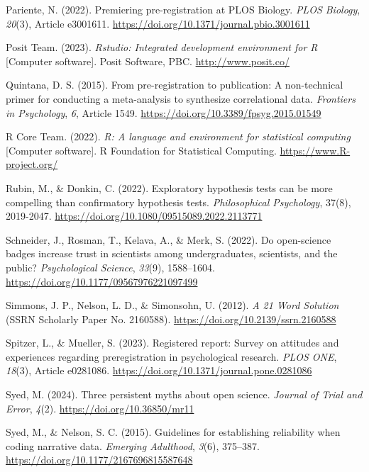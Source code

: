 \documentclass[authordate, meta, issue]{jote-new-article}
\begin{document}
	Pariente, N. (2022). Premiering pre-registration at PLOS Biology. \emph{PLOS Biology}, \emph{20}(3), Article e3001611. \url{https://doi.org/10.1371/journal.pbio.3001611}



	Posit Team. (2023). \emph{Rstudio: Integrated development environment for R} [Computer software]. Posit Software, PBC. \url{http://www.posit.co/}



	Quintana, D. S. (2015). From pre-registration to publication: A non-technical primer for conducting a meta-analysis to synthesize correlational data. \emph{Frontiers in Psychology}, \emph{6}, Article 1549. \url{https://doi.org/10.3389/fpsyg.2015.01549}



	R Core Team. (2022). \emph{R: A language and environment for statistical computing} [Computer software]. R Foundation for Statistical Computing. \url{https://www.R-project.org/}



	Rubin, M., \& Donkin, C. (2022). Exploratory hypothesis tests can be more compelling than confirmatory hypothesis tests. \emph{Philosophical Psychology}, 37(8), 2019-2047. \url{https://doi.org/10.1080/09515089.2022.2113771}



	Schneider, J., Rosman, T., Kelava, A., \& Merk, S. (2022). Do open-science badges increase trust in scientists among undergraduates, scientists, and the public? \emph{Psychological Science}, \emph{33}(9), 1588--1604. \url{https://doi.org/10.1177/09567976221097499}



	Simmons, J. P., Nelson, L. D., \& Simonsohn, U. (2012). \emph{A 21 Word Solution} (SSRN Scholarly Paper No. 2160588). \url{https://doi.org/10.2139/ssrn.2160588}



	Spitzer, L., \& Mueller, S. (2023). Registered report: Survey on attitudes and experiences regarding preregistration in psychological research. \emph{PLOS ONE}, \emph{18}(3), Article e0281086. \url{https://doi.org/10.1371/journal.pone.0281086}



	Syed, M. (2024). Three persistent myths about open science. \emph{Journal of Trial and Error}, \emph{4}(2). \url{https://doi.org/10.36850/mr11}



	Syed, M., \& Nelson, S. C. (2015). Guidelines for establishing reliability when coding narrative data. \emph{Emerging Adulthood}, \emph{3}(6), 375--387. \url{https://doi.org/10.1177/2167696815587648}
\end{document}
